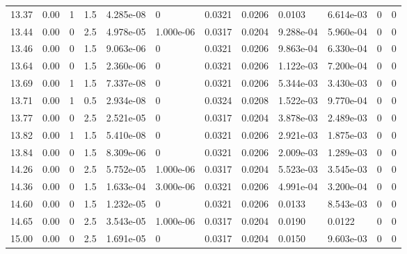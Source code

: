 \documentclass[preview]{standalone}
\begin{document}
{{{\begin{tabular}{L{1.2cm}C{1.2cm} C{0.3cm}C{0.5cm} C{1.4cm}C{1.4cm} C{1.4cm}C{1.4cm} C{1.6cm}C{1.6cm} C{1.6cm}C{1.6cm}}
  13.37  &  0.00  & 1     & 1.5 &  4.285e-08  & 0  &  0.0321&   0.0206& 0.0103 & 6.614e-03   &  0 & 0  \\ 
  13.44  &  0.00  & 0     & 2.5 &  4.978e-05  & 1.000e-06  &  0.0317&   0.0204& 9.288e-04 & 5.960e-04   &  0 & 0  \\ 
  13.46  &  0.00  & 0     & 1.5 &  9.063e-06  & 0  &  0.0321&   0.0206& 9.863e-04 & 6.330e-04   &  0 & 0  \\ 
  13.64  &  0.00  & 0     & 1.5 &  2.360e-06  & 0  &  0.0321&   0.0206& 1.122e-03 & 7.200e-04   &  0 & 0  \\ 
  13.69  &  0.00  & 1     & 1.5 &  7.337e-08  & 0  &  0.0321&   0.0206& 5.344e-03 & 3.430e-03   &  0 & 0  \\ 
  13.71  &  0.00  & 1     & 0.5 &  2.934e-08  & 0  &  0.0324&   0.0208& 1.522e-03 & 9.770e-04   &  0 & 0  \\ 
  13.77  &  0.00  & 0     & 2.5 &  2.521e-05  & 0  &  0.0317&   0.0204& 3.878e-03 & 2.489e-03   &  0 & 0  \\ 
  13.82  &  0.00  & 1     & 1.5 &  5.410e-08  & 0  &  0.0321&   0.0206& 2.921e-03 & 1.875e-03   &  0 & 0  \\ 
  13.84  &  0.00  & 0     & 1.5 &  8.309e-06  & 0  &  0.0321&   0.0206& 2.009e-03 & 1.289e-03   &  0 & 0  \\ 
  14.26  &  0.00  & 0     & 2.5 &  5.752e-05  & 1.000e-06  &  0.0317&   0.0204& 5.523e-03 & 3.545e-03   &  0 & 0  \\ 
  14.36  &  0.00  & 0     & 1.5 &  1.633e-04  & 3.000e-06  &  0.0321&   0.0206& 4.991e-04 & 3.200e-04   &  0 & 0  \\ 
  14.60  &  0.00  & 0     & 1.5 &  1.232e-05  & 0  &  0.0321&   0.0206& 0.0133 & 8.543e-03   &  0 & 0  \\ 
  14.65  &  0.00  & 0     & 2.5 &  3.543e-05  & 1.000e-06  &  0.0317&   0.0204& 0.0190 & 0.0122   &  0 & 0  \\ 
  15.00  &  0.00  & 0     & 2.5 &  1.691e-05  & 0  &  0.0317&   0.0204& 0.0150 & 9.603e-03   &  0 & 0  \\ 
\hline 
\end{tabular} 

}}}
\end{document}
